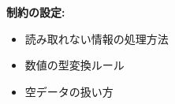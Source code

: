 \textbf{制約の設定:}
\begin{itemize}
    \item 読み取れない情報の処理方法
    \item 数値の型変換ルール
    \item 空データの扱い方
\end{itemize}








